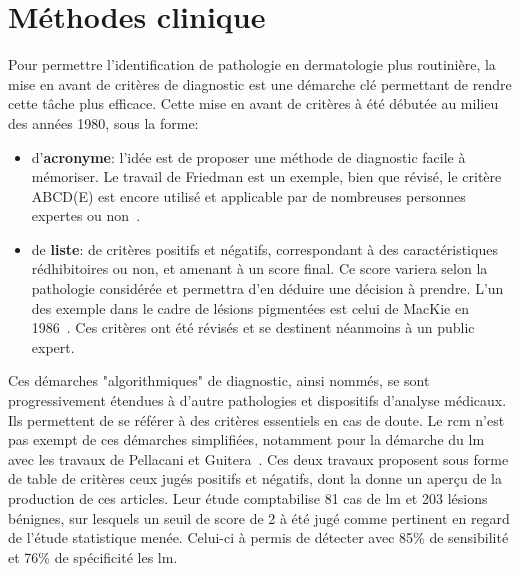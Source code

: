 \section{Méthodes clinique}
\label{sec:clinical_methods}
Pour permettre l'identification de pathologie en dermatologie plus routinière, la mise en avant de critères de diagnostic est une démarche clé permettant de rendre cette tâche plus efficace. Cette mise en avant de critères à été débutée au milieu des années 1980, sous la forme:
\begin{itemize}
    \item d'\textbf{acronyme}: l'idée est de proposer une méthode de diagnostic facile à mémoriser. Le travail de Friedman est un exemple, bien que révisé, le critère ABCD(E) est encore utilisé et applicable par de nombreuses personnes expertes ou non~\cite{Friedman1985}.
    \item de \textbf{liste}: de critères positifs et négatifs, correspondant à des caractéristiques rédhibitoires ou non, et amenant à un score final. Ce score variera selon la pathologie considérée et permettra d'en déduire une décision à prendre. L'un des exemple dans le cadre de lésions pigmentées est celui de MacKie en 1986~\cite{mackie1986}. Ces critères ont été révisés et se destinent néanmoins à un public expert. 
\end{itemize}\par

Ces démarches "algorithmiques" de diagnostic, ainsi nommés, se sont progressivement étendues à d'autre pathologies et dispositifs d'analyse médicaux. Ils permettent de se référer à des critères essentiels en cas de doute. Le \gls{rcm} n'est pas exempt de ces démarches simplifiées, notamment pour la démarche du \gls{lm} avec les travaux de Pellacani et Guitera~\cite{Pellacani2007, Guitera2010}. Ces deux travaux proposent sous forme de table de critères ceux jugés positifs et négatifs, dont la  donne un aperçu de la production de ces articles. Leur étude comptabilise 81 cas de \gls{lm} et 203 lésions bénignes, sur lesquels un seuil de score de 2 à été jugé comme pertinent en regard de l'étude statistique menée. Celui-ci à permis de détecter avec 85\% de sensibilité et 76\% de spécificité les \gls{lm}.\par


